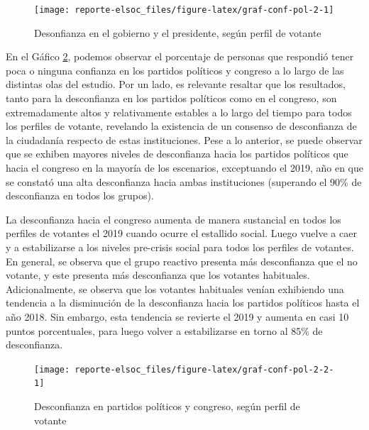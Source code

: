 \documentclass[
  12pt,
]{book}
\begin{document}
\begin{figure}

{\centering \texttt{[image: reporte-elsoc\_files/figure-latex/graf-conf-pol-2-1]} 

}

\caption{Desonfianza en el gobierno y el presidente, según perfil de votante}\label{fig:graf-conf-pol-2}
\end{figure}

En el Gáfico \ref{fig:graf-conf-pol-2-2}, podemos observar el porcentaje de personas que respondió tener poca o ninguna confianza en los partidos políticos y congreso a lo largo de las distintas olas del estudio. Por un lado, es relevante resaltar que los resultados, tanto para la desconfianza en los partidos políticos como en el congreso, son extremadamente altos y relativamente estables a lo largo del tiempo para todos los perfiles de votante, revelando la existencia de un consenso de desconfianza de la ciudadanía respecto de estas instituciones. Pese a lo anterior, se puede observar que se exhiben mayores niveles de desconfianza hacia los partidos políticos que hacia el congreso en la mayoría de los escenarios, exceptuando el 2019, año en que se constató una alta desconfianza hacia ambas instituciones (superando el 90\% de desconfianza en todos los grupos).

La desconfianza hacia el congreso aumenta de manera sustancial en todos los perfiles de votantes el 2019 cuando ocurre el estallido social. Luego vuelve a caer y a estabilizarse a los niveles pre-crisis social para todos los perfiles de votantes. En general, se observa que el grupo reactivo presenta más desconfianza que el no votante, y este presenta más desconfianza que los votantes habituales. Adicionalmente, se observa que los votantes habituales venían exhibiendo una tendencia a la disminución de la desconfianza hacia los partidos políticos hasta el año 2018. Sin embargo, esta tendencia se revierte el 2019 y aumenta en casi 10 puntos porcentuales, para luego volver a estabilizarse en torno al 85\% de desconfianza.

\begin{figure}

{\centering \texttt{[image: reporte-elsoc\_files/figure-latex/graf-conf-pol-2-2-1]} 

}

\caption{Desconfianza en partidos políticos y congreso, según perfil de votante}\label{fig:graf-conf-pol-2-2}
\end{figure}
\end{document}
